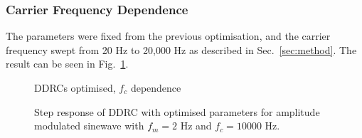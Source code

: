 \documentclass[../main2.tex]{subfiles}
\providecommand{\rootdir}{..}
\begin{document}
\subsubsection{Carrier Frequency Dependence}
The parameters were fixed from the previous optimisation, and the carrier frequency swept from 20 Hz to 20,000 Hz as described in Sec.~\ref{sec:method}. The result can be seen in Fig.~\ref{fig:complete_DDRC_opt_fc_dep}.

\begin{figure}[h]
\centerline{}
\caption{DDRCs optimised, $f_c$ dependence}
\label{fig:complete_DDRC_opt_fc_dep}
\end{figure}

\begin{figure}[h]
\centerline{}
\caption{Step response of DDRC with optimised parameters for amplitude modulated sinewave with $f_m=2$ Hz and $f_c=10000$ Hz.}
\label{fig:complete_DDRC_opt_step_response}
\end{figure}
\end{document}
